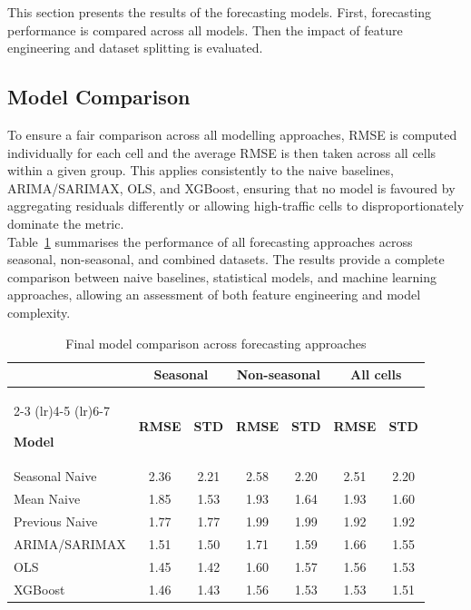 This section presents the results of the forecasting models. 
First, forecasting performance is compared across all models. 
Then the impact of feature engineering and dataset splitting 
is evaluated. \\

\subsection{Model Comparison}

To ensure a fair comparison across all modelling approaches, RMSE is computed individually for each cell and the average RMSE is then taken across all cells within a given group. This applies consistently to the naive baselines, ARIMA/SARIMAX, OLS, and XGBoost, ensuring that no model is favoured by aggregating residuals differently or allowing high-traffic cells to disproportionately dominate the metric. \\

Table~\ref{tab:final_model_comparison} summarises the performance of all forecasting approaches across seasonal, non-seasonal, and combined datasets. The results provide a complete comparison between naive baselines, statistical models, and machine learning approaches, allowing an assessment of both feature engineering and model complexity. \\

\begin{table}[htbp]
	\centering
	\caption{Final model comparison across forecasting approaches}
	\label{tab:final_model_comparison}
	
	\begin{tabular}{lcccccc}
		\toprule
		& \multicolumn{2}{c}{\textbf{Seasonal}} 
		& \multicolumn{2}{c}{\textbf{Non-seasonal}} 
		& \multicolumn{2}{c}{\textbf{All cells}} \\
		
		\cmidrule(lr){2-3}
		\cmidrule(lr){4-5}
		\cmidrule(lr){6-7}
		
		\textbf{Model} 
		& \textbf{RMSE} & \textbf{STD}
		& \textbf{RMSE} & \textbf{STD}
		& \textbf{RMSE} & \textbf{STD} \\
		
		\midrule
		
		Seasonal Naive 
		& 2.36 & 2.21
		& 2.58 & 2.20
		& 2.51 & 2.20 \\
		
		Mean Naive     
		& 1.85 & 1.53
		& 1.93 & 1.64
		& 1.93 & 1.60 \\
		
		Previous Naive 
		& 1.77 & 1.77
		& 1.99 & 1.99
		& 1.92 & 1.92 \\
		
		ARIMA/SARIMAX 
		& 1.51 & 1.50
		& 1.71 & 1.59
		& 1.66 & 1.55 \\
		
		OLS 
		& 1.45 & 1.42
		& 1.60 & 1.57
		& 1.56 & 1.53 \\
		
		XGBoost 
		& 1.46 & 1.43
		& 1.56 & 1.53
		& 1.53 & 1.51 \\
		
		\bottomrule
	\end{tabular}
\end{table}

